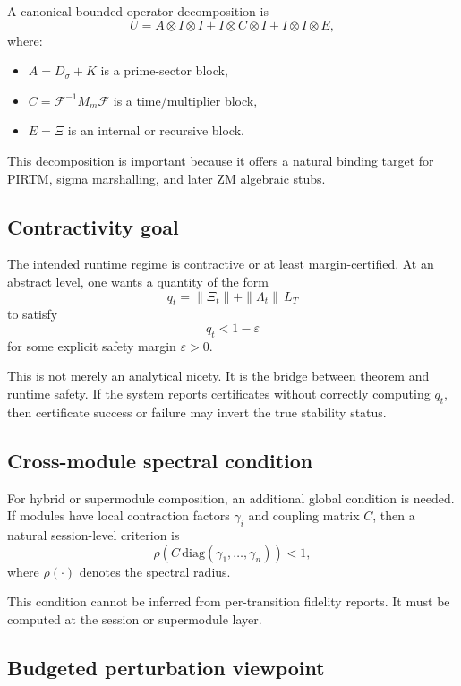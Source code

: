 \documentclass[11pt]{article}
\begin{document}
A canonical bounded operator decomposition is
\[
U = A \otimes I \otimes I + I \otimes C \otimes I + I \otimes I \otimes E,
\]
where:
\begin{itemize}
\item \(A = D_{\sigma} + K\) is a prime-sector block,
\item \(C = \mathcal{F}^{-1} M_m \mathcal{F}\) is a time/multiplier block,
\item \(E = \Xi\) is an internal or recursive block.
\end{itemize}

This decomposition is important because it offers a natural binding target for PIRTM, sigma marshalling, and later ZM algebraic stubs.

\subsection{Contractivity goal}

The intended runtime regime is contractive or at least margin-certified. At an abstract level, one wants a quantity of the form
\[
q_t = \|\Xi_t\| + \|\Lambda_t\|\,L_T
\]
to satisfy
\[
q_t < 1 - \varepsilon
\]
for some explicit safety margin \(\varepsilon > 0\).

This is not merely an analytical nicety. It is the bridge between theorem and runtime safety. If the system reports certificates without correctly computing \(q_t\), then certificate success or failure may invert the true stability status.

\subsection{Cross-module spectral condition}

For hybrid or supermodule composition, an additional global condition is needed. If modules have local contraction factors \(\gamma_i\) and coupling matrix \(C\), then a natural session-level criterion is
\[
\rho\!\left(C \,\mathrm{diag}(\gamma_1,\dots,\gamma_n)\right) < 1,
\]
where \(\rho(\cdot)\) denotes the spectral radius.

This condition cannot be inferred from per-transition fidelity reports. It must be computed at the session or supermodule layer.

\subsection{Budgeted perturbation viewpoint}
\end{document}
